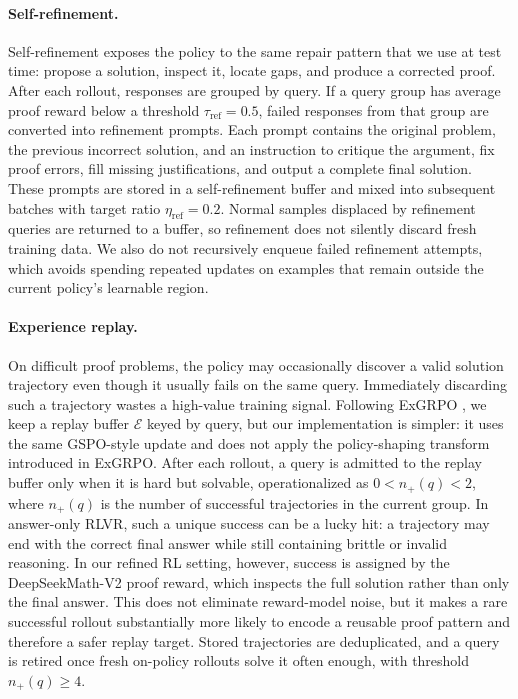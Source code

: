 \documentclass{llmxive}
\begin{document}
\paragraph{Self-refinement.}
Self-refinement exposes the policy to the same repair pattern that we use at
test time: propose a solution, inspect it, locate gaps, and produce a corrected
proof. After each rollout, responses are grouped by query. If a query group has
average proof reward below a threshold $\tau_{\mathrm{ref}}=0.5$, failed
responses from that group are converted into refinement prompts. Each prompt
contains the original problem, the previous incorrect solution, and an
instruction to critique the argument, fix proof 
errors, fill
missing justifications, and output a complete final solution. These prompts are
stored in a self-refinement buffer and mixed into subsequent batches with target
ratio $\eta_{\mathrm{ref}}=0.2$. Normal samples displaced by refinement queries
are returned to a buffer, so refinement does not silently discard fresh
training data. We also do not recursively enqueue failed refinement attempts,
which avoids spending repeated updates on examples that remain outside the
current policy's learnable region.

\paragraph{Experience replay.}
On difficult proof problems,
the policy may occasionally discover a valid solution trajectory even though it
usually fails on the same query. Immediately discarding such a trajectory wastes
a high-value training signal. Following ExGRPO
\citep{exgrpo}, we keep a replay buffer $\mathcal{E}$ keyed by query, but our
implementation is simpler: it uses the same GSPO-style update and does not apply
the policy-shaping transform introduced in ExGRPO. After each rollout, a query
is admitted to the replay buffer only when it is hard but solvable, operationalized as
$0<n_+(q)<2$, where $n_+(q)$ is the number of successful trajectories in the
current group. In answer-only RLVR, such a unique success can be a lucky hit: a
trajectory may end with the correct final answer while still containing brittle
or invalid reasoning\citep{exgrpo}. 
In our refined RL setting, however, success is assigned by the
DeepSeekMath-V2 proof reward, which inspects the full solution rather than only
the final answer. This does not eliminate reward-model noise, but it makes a
rare successful rollout substantially more likely to encode a reusable proof
pattern and therefore a safer replay target. Stored trajectories are
deduplicated, and a query is retired once fresh on-policy rollouts solve it
often enough, with threshold $n_+(q)\ge 4$.
\end{document}
